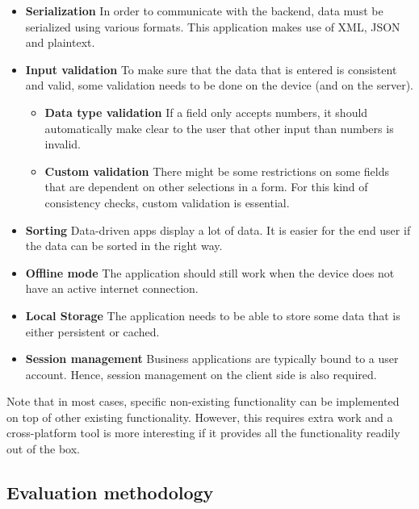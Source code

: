 \begin{itemize}
\begin{itemize}
    \end{itemize}
    \item \textbf{Serialization} In order to communicate with the backend,  data must be serialized using various formats. This application makes use of XML, JSON and plaintext.
    \item \textbf{Input validation} To make sure that the data that is entered is consistent and valid, some validation needs to be done on the device (and on the server).
    \begin{itemize}
        \item \textbf{Data type validation} If a field only accepts numbers, it should automatically make clear to the user that other input than numbers is invalid.
        \item \textbf{Custom validation} There might be some restrictions on some fields that are dependent on other selections in a form. For this kind of consistency checks, custom validation is essential.
    \end{itemize}
    \item \textbf{Sorting} Data-driven apps display a lot of data. It is easier for the end user if the data can be sorted in the right way. 
    \item \textbf{Offline mode} The application should still work when the device does not have an active internet connection.
    \item \textbf{Local Storage} The application needs to be able to store some data that is either persistent or cached.
    \item \textbf{Session management} Business applications are typically bound to a user account. Hence, session management on the client side is also required.
\end{itemize}

Note that in most cases, specific non-existing functionality can be implemented on top of other existing functionality. However, this requires extra work and a cross-platform tool is more interesting if it provides all the functionality readily out of the box.

\subsection{Evaluation methodology}
\label{sec:evaluation-method}

